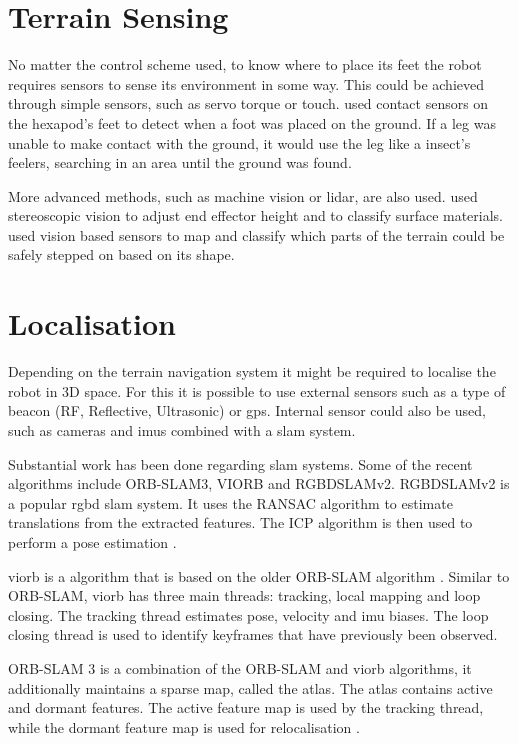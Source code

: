 \section{Terrain Sensing}
    No matter the control scheme used, to know where to place its feet the robot requires sensors to sense its environment in some way. This could be achieved through simple sensors, such as servo torque or touch. \cite{Zha2019} used contact sensors on the hexapod's feet to detect when a foot was placed on the ground. If a leg was unable to make contact with the ground, it would use the leg like a insect's feelers, searching in an area until the ground was found.

    More advanced methods, such as machine vision or \ac{lidar}, are also used. \cite{homberger2017terrain} used stereoscopic vision to adjust end effector height and to classify surface materials. \cite{Mastalli2020Motion} used vision based sensors to map and classify which parts of the terrain could be safely stepped on based on its shape.

\section{Localisation}
    Depending on the terrain navigation system it might be required to localise the robot in 3D space. For this it is possible to use external sensors such as a type of beacon (RF, Reflective, Ultrasonic) or \ac{gps}. Internal sensor could also be used, such as cameras and \acp{imu} combined with a \ac{slam} system.

    Substantial work has been done regarding \ac{slam} systems. Some of the recent algorithms include ORB-SLAM3, VIORB and RGBDSLAMv2. RGBDSLAMv2 is a popular \ac{rgbd} \ac{slam} system. It uses the RANSAC algorithm to estimate translations from the extracted features. The ICP algorithm is then used to perform a pose estimation \citep{macario2022comprehensive}.
    
    \ac{viorb} is a algorithm that is based on the older ORB-SLAM algorithm \citep{mur2017orb}. Similar to ORB-SLAM, \ac{viorb} has three main threads: tracking, local mapping and loop closing. The tracking thread estimates pose, velocity and \ac{imu} biases. The loop closing thread is used to identify keyframes that have previously been observed.

    ORB-SLAM 3 is a combination of the ORB-SLAM and \ac{viorb} algorithms, it additionally maintains a sparse map, called the atlas. The atlas contains active and dormant features. The active feature map is used by the tracking thread, while the dormant feature map is used for relocalisation \citep{macario2022comprehensive}.
    

